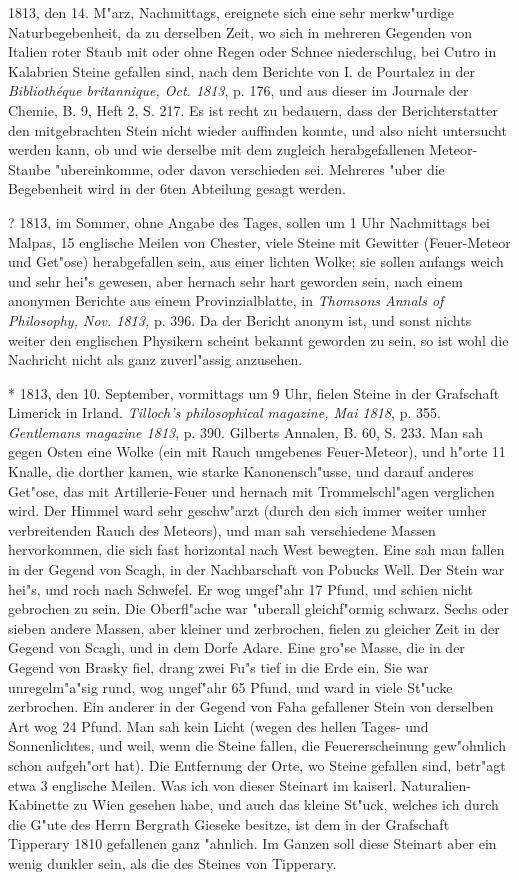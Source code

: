 \documentclass[a4paper, 11pt, oneside, polutonikogreek, german]{article}
\begin{document}
1813, den 14. M"arz, Nachmittags, ereignete sich eine sehr merkw"urdige Naturbegebenheit, da zu derselben Zeit, wo sich in mehreren Gegenden von Italien roter Staub mit oder ohne Regen oder Schnee niederschlug, bei Cutro in Kalabrien Steine gefallen sind, nach dem Berichte von I. de Pourtalez in der \emph{Bibliothéque britannique, Oct. 1813}, p. 176, und aus dieser im Journale der Chemie, B. 9, Heft 2, S. 217. Es ist recht zu bedauern, dass der Berichterstatter den mitgebrachten Stein nicht wieder auffinden konnte, und also nicht untersucht werden kann, ob und wie derselbe mit dem zugleich herabgefallenen Meteor-Staube "ubereinkomme, oder davon verschieden sei. Mehreres "uber die Begebenheit wird in der 6ten Abteilung gesagt werden.

? 1813, im Sommer, ohne Angabe des Tages, sollen um 1 Uhr Nachmittags bei Malpas, 15 englische Meilen von Chester, viele Steine mit Gewitter (Feuer-Meteor und Get"ose) herabgefallen sein, aus einer lichten Wolke; sie sollen anfangs weich und sehr hei"s gewesen, aber hernach sehr hart geworden sein, nach einem anonymen Berichte aus einem Provinzialblatte, in \emph{Thomsons Annals of Philosophy, Nov. 1813,} p. 396. Da der Bericht anonym ist, und sonst nichts weiter den englischen Physikern scheint bekannt geworden zu sein, so ist wohl die Nachricht nicht als ganz zuverl"assig anzusehen.

* 1813, den 10. September, vormittags um 9 Uhr, fielen Steine in der Grafschaft Limerick in Irland. \emph{Tilloch's philosophical magazine, Mai 1818}, p. 355. \emph{Gentlemans magazine 1813}, p. 390. Gilberts Annalen, B. 60, S. 233. Man sah gegen Osten eine Wolke (ein mit Rauch umgebenes Feuer-Meteor), und h"orte 11 Knalle, die dorther kamen, wie starke Kanonensch"usse, und darauf anderes Get"ose, das mit Artillerie-Feuer und hernach mit Trommelschl"agen verglichen wird. Der Himmel ward sehr geschw"arzt (durch den sich immer weiter umher verbreitenden Rauch des Meteors), und man sah verschiedene Massen hervorkommen, die sich fast horizontal nach West bewegten. Eine sah man fallen in der Gegend von Scagh, in der Nachbarschaft von Pobucks Well. Der Stein war hei"s, und roch nach Schwefel. Er wog ungef"ahr 17 Pfund, und schien nicht gebrochen zu sein. Die Oberfl"ache war "uberall gleichf"ormig schwarz. Sechs oder sieben andere Massen, aber kleiner und zerbrochen, fielen zu gleicher Zeit in der Gegend von Scagh, und in dem Dorfe Adare. Eine gro"se Masse, die in der Gegend von Brasky fiel, drang zwei Fu"s tief in die Erde ein. Sie war unregelm"a"sig rund, wog ungef"ahr 65 Pfund, und ward in viele St"ucke zerbrochen. Ein anderer in der Gegend von Faha gefallener Stein von derselben Art wog 24 Pfund. Man sah kein Licht (wegen des hellen Tages- und Sonnenlichtes, und weil, wenn die Steine fallen, die Feuererscheinung gew"ohnlich schon aufgeh"ort hat). Die Entfernung der Orte, wo Steine gefallen sind, betr"agt etwa 3 englische Meilen. Was ich von dieser Steinart im kaiserl. Naturalien-Kabinette zu Wien gesehen habe, und auch das kleine St"uck, welches ich durch die G"ute des Herrn Bergrath Gieseke besitze, ist dem in der Grafschaft Tipperary 1810 gefallenen ganz "ahnlich. Im Ganzen soll diese Steinart aber ein wenig dunkler sein, als die des Steines von Tipperary.
\end{document}
